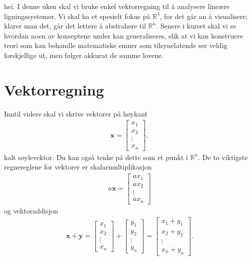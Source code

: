 

\label{ch:vektor-og-matriselikninger}






\noindent%

\noindent
hei.
I denne uken skal vi bruke enkel vektorregning til å analysere lineære ligningssystemer. Vi skal ha et spesielt fokus på $\mathbb{R}^3$, for det går an å visualisere; klarer man det, går det lettere å abstrahere til $\mathbb{R}^n$. Senere i kurset skal vi se hvordan noen av konseptene under kan generaliseres, slik at vi kan konstruere teori som kan behandle matematiske emner som tilsynelatende ser veldig forskjellige ut, men følger akkurat de samme lovene. 

\section*{Vektorregning}
Inntil videre skal vi skrive vektorer på høykant
\begin{align*}
\mathbf{x}=
\begin{bmatrix}
x_1  \\
x_2 \\
\vdots \\
x_n
\end{bmatrix},
\end{align*}
kalt søylevektor. Du kan også tenke på dette som et punkt i $\mathbb{R}^n$. De to viktigste regnereglene for vektorer er skalarmultiplikasjon
\begin{align*}
a\mathbf{x}=
\begin{bmatrix}
ax_1  \\
ax_2 \\
\vdots \\
ax_n
\end{bmatrix}
\end{align*}
og vektoraddisjon
\begin{align*}
\mathbf{x}+\mathbf{y}=
\begin{bmatrix}
x_1  \\
x_2 \\
\vdots \\
x_n
\end{bmatrix}
+
\begin{bmatrix}
y_1  \\
y_2 \\
\vdots \\
y_n
\end{bmatrix}
=
\begin{bmatrix}
x_1 + y_1  \\
x_2 + y_2\\
\vdots \\
x_n + y_n
\end{bmatrix}.
\end{align*}
